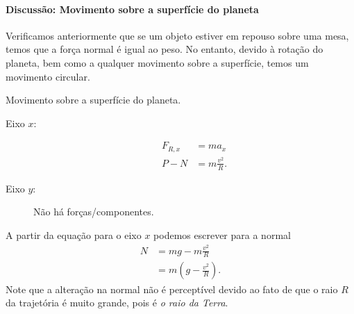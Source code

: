 \paragraph{Discussão: Movimento sobre a superfície do planeta}

Verificamos anteriormente que se um objeto estiver em repouso sobre uma mesa, temos que a força normal é igual ao peso. No entanto, devido à rotação do planeta, bem como a qualquer movimento sobre a superfície, temos um movimento circular.

\begin{marginfigure}
\centering
{}
\caption{Movimento sobre a superfície do planeta.}
\end{marginfigure}

\begin{description}
    \item[Eixo $x$:] 
        \begin{align}
            F_{R, x} &= m a_x \\
            P - N &= m \frac{v^2}{R}.
        \end{align}
    \item[Eixo $y$:] Não há forças/componentes.
\end{description}

\noindent{}A partir da equação para o eixo $x$ podemos escrever para a normal
\begin{align}
    N &= mg-m\frac{v^2}{R} \\
    &= m \left(g - \frac{v^2}{R}\right).
\end{align}
%
Note que a alteração na normal não é perceptível devido ao fato de que o raio $R$ da trajetória é muito grande, pois é \emph{o raio da Terra}.

